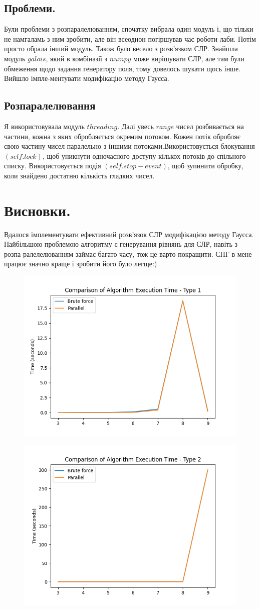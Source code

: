 \documentclass[a4paper,12pt]{article}
\begin{document}
\subsection{Проблеми.}
Були проблеми з розпаралелюванням, спочатку вибрала один модуль і, що тільки не намгаламь з ним зробити, але він всеоднон погіршував час роботи лаби. Потім просто обрала інший модуль. Також було весело з розв'язком СЛР. Знайшла модуль $galois$, який в комбіназії з $numpy$ може вирішувати СЛР, але там були обмеження щодо задання генератору поля, тому довелось шукати щось інше. Вийшло імпле-ментувати модифікацію методу Гаусса.
\subsection{Розпаралелювання}
Я використовувала модуль $threading$. Далі увесь $range$ чисел розбивається на частини, кожна з яких обробляється окремим потоком.  Кожен потік обробляє свою частину чисел паралельно з іншими потоками.Використовується блокування $(self.lock)$, щоб уникнути одночасного доступу кількох потоків до спільного списку. Використовується подія $(self.stop-event)$, щоб зупинити обробку, коли знайдено достатню кількість гладких чисел.
\section{Висновки.}
Вдалося імплементувати ефективний розв'язок СЛР модифікацією методу Гаусса. Найбільшою проблемою алгоритму є генерування рівнянь для СЛР, навіть з розпа-ралелелюванням займає багато часу, тож це варто покращити. СПГ в мене працює значно краще і зробити його було легще:)
\begin{figure}[!htb]\centering
\includegraphics[width=0.65\linewidth]{plot1.png}
\end{figure}
\begin{figure}[!htb]\centering
\includegraphics[width=0.65\linewidth]{plot2.png}
\end{figure}
\end{document}
